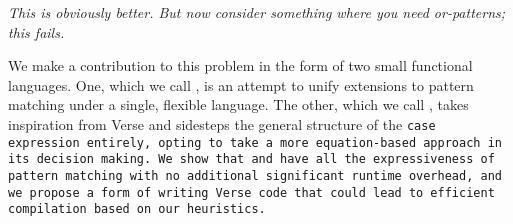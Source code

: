 \documentclass[manuscript,screen,review, 12pt]{acmart}
\begin{document}
\it{This is obviously better. But now consider something where you need 
or-patterns; this fails. }

We make a contribution to this problem in the form of two small functional
languages. One, which we call {\PPlus}, is an attempt to unify extensions to
pattern matching under a single, flexible language. The other, which we call
{\VMinus}, takes inspiration from Verse and sidesteps the general structure of
the \tt{case} expression entirely, opting to take a more equation-based approach
in its decision making. We show that {\PPlus} and {\VMinus} have all the
expressiveness of pattern matching with no additional significant runtime
overhead, and we propose a form of writing Verse code that could lead to
efficient compilation based on our heuristics. 






    
    
    
\end{document}
